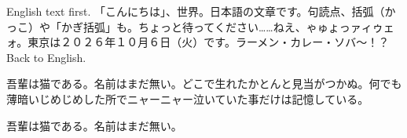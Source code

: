 \documentclass{article}
\begin{document}
English text first.
\textjapanese{「こんにちは」、世界。日本語の文章です。句読点、括弧（かっこ）や「かぎ括弧」も。ちょっと待ってください……ねえ、ゃゅょっァィゥェォ。東京は２０２６年１０月６日（火）です。ラーメン・カレー・ソバ〜！？}
Back to English.

\begin{japanese}
吾輩は猫である。名前はまだ無い。どこで生れたかとんと見当がつかぬ。何でも薄暗いじめじめした所でニャーニャー泣いていた事だけは記憶している。
\end{japanese}


\vbox{\hsize=80pt \textjapanese{吾輩は猫である。名前はまだ無い。}}
\end{document}
